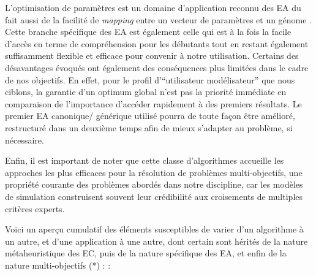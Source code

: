 
L'optimisation de paramètres est un domaine d'application reconnu des EA du fait aussi de la facilité de \textit{mapping} entre un vecteur de paramètres et un génome \autocite[83]{DeJong2006a}. Cette branche spécifique des EA est également celle qui est à la fois la facile d'accès en terme de compréhension pour les débutants tout en restant également suffisamment flexible et efficace pour convenir à notre utilisation. Certains des désavantages évoqués ont également des conséquences plus limitées dans le cadre de nos objectifs. En effet, pour le profil d'\enquote{utilisateur modélisateur} que nous ciblons, la garantie d'un optimum global n'est pas la priorité immédiate en comparaison de l'importance d'accéder rapidement à des premiers résultats. Le premier EA canonique/ générique utilisé pourra de toute façon être amélioré, restructuré dans un deuxième temps afin de mieux s'adapter au problème, si nécessaire.

Enfin, il est important de noter que cette classe d'algorithmes accueille les approches les plus efficaces pour la résolution de problèmes multi-objectifs, une propriété courante des problèmes abordés dans notre discipline, car les modèles de simulation construisent souvent leur crédibilité aux croisements de multiples critères experts.



Voici un aperçu cumulatif des éléments susceptibles de varier d'un algorithme à un autre, et d'une application à une autre, dont certain sont hérités de la nature métaheuristique des EC, puis de la nature spécifique des EA, et enfin de la nature multi-objectifs (*) : \autocites[69,72,115]{DeJong2006a}[264-269]{Weise2011}[91]{Liefooghe2010} :

